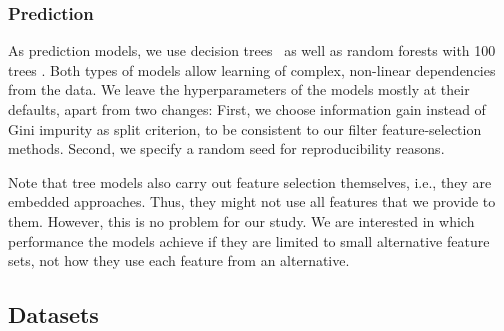 \documentclass{article}
\theoremstyle{definition}
\begin{document}
\subsubsection{Prediction}
\label{sec:afs:experimental-design:approaches:prediction}

As prediction models, we use decision trees~\cite{breiman1984classification} as well as random forests with 100 trees \cite{breiman2001random}.
Both types of models allow learning of complex, non-linear dependencies from the data.
We leave the hyperparameters of the models mostly at their defaults, apart from two changes:
First, we choose information gain instead of Gini impurity as split criterion, to be consistent to our filter feature-selection methods.
Second, we specify a random seed for reproducibility reasons.

Note that tree models also carry out feature selection themselves, i.e., they are embedded approaches.
Thus, they might not use all features that we provide to them.
However, this is no problem for our study.
We are interested in which performance the models achieve if they are limited to small alternative feature sets, not how they use each feature from an alternative.

\subsection{Datasets}
\label{sec:afs:experimental-design:datasets}
\end{document}
